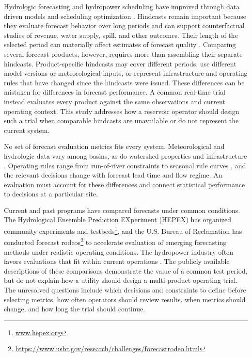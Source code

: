\documentclass[MLA]{USG} %
\begin{document}
Hydrologic forecasting and hydropower scheduling have improved through data driven models \citep{kratzertLearningUniversalRegional2019a} and scheduling optimization \citep{zhangOptimizationShorttermHydropower2024}. Hindcasts remain important because they evaluate forecast behavior over long periods and can support counterfactual studies of revenue, water supply, spill, and other outcomes. Their length of the selected period can materially affect estimates of forecast quality \citep{randrianasoloImpactStreamflowData2014}.
Comparing several forecast products, however, requires more than assembling their separate hindcasts. Product-specific hindcasts may cover different periods, use different model versions or meteorological inputs, or represent infrastructure and operating rules that have changed since the hindcasts were issued. These differences can be mistaken for differences in forecast performance. A common real-time trial instead evaluates every product against the same observations and current operating context. This study addresses how a reservoir operator should design such a trial when comparable hindcasts are unavailable or do not represent the current system.

No set of forecast evaluation metrics fits every system. Meteorological and hydrologic data vary among basins, as do watershed properties and infrastructure \citep{phamEvaluationRandomForests2021}. Operating rules range from run-of-river constraints to seasonal rule curves \citep{zajacImpactLakeReservoir2017}, and the relevant decisions change with forecast lead time and flow regime. An evaluation must account for these differences and connect statistical performance to decisions at a particular site.

Current and past programs have compared forecasts under common conditions. The Hydrological Ensemble Prediction EXperiment (HEPEX) has organized community experiments and testbeds\footnote{\url{www.hepex.org}}, and the U.S. Bureau of Reclamation has conducted forecast rodeos\footnote{\url{https://www.usbr.gov/research/challenges/forecastrodeo.html}} to accelerate evaluation of emerging forecasting methods under realistic operating conditions. The hydropower industry often favors evaluations that fit within current operations \citep{krajewskiRealtimeStreamflowForecasting2021}. The publicly available descriptions of these comparisons demonstrate the value of a common test period, but do not explain how a utility should design a multi-product operating trial. The unresolved questions include which decisions and constraints to define before selecting metrics, how often operators should review results, when metrics should change, and how long the trial should continue.
\end{document}
